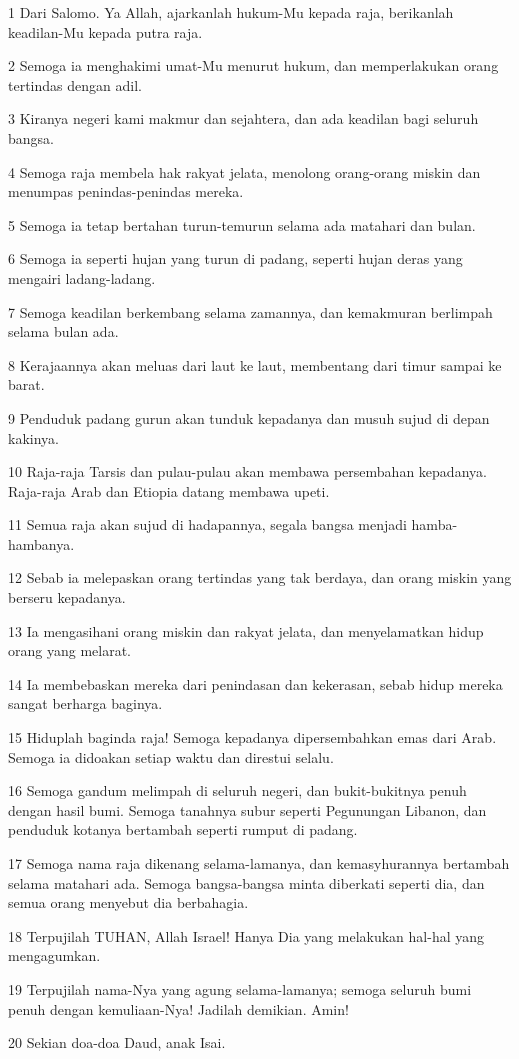 \par 1 Dari Salomo. Ya Allah, ajarkanlah hukum-Mu kepada raja, berikanlah keadilan-Mu kepada putra raja.
\par 2 Semoga ia menghakimi umat-Mu menurut hukum, dan memperlakukan orang tertindas dengan adil.
\par 3 Kiranya negeri kami makmur dan sejahtera, dan ada keadilan bagi seluruh bangsa.
\par 4 Semoga raja membela hak rakyat jelata, menolong orang-orang miskin dan menumpas penindas-penindas mereka.
\par 5 Semoga ia tetap bertahan turun-temurun selama ada matahari dan bulan.
\par 6 Semoga ia seperti hujan yang turun di padang, seperti hujan deras yang mengairi ladang-ladang.
\par 7 Semoga keadilan berkembang selama zamannya, dan kemakmuran berlimpah selama bulan ada.
\par 8 Kerajaannya akan meluas dari laut ke laut, membentang dari timur sampai ke barat.
\par 9 Penduduk padang gurun akan tunduk kepadanya dan musuh sujud di depan kakinya.
\par 10 Raja-raja Tarsis dan pulau-pulau akan membawa persembahan kepadanya. Raja-raja Arab dan Etiopia datang membawa upeti.
\par 11 Semua raja akan sujud di hadapannya, segala bangsa menjadi hamba-hambanya.
\par 12 Sebab ia melepaskan orang tertindas yang tak berdaya, dan orang miskin yang berseru kepadanya.
\par 13 Ia mengasihani orang miskin dan rakyat jelata, dan menyelamatkan hidup orang yang melarat.
\par 14 Ia membebaskan mereka dari penindasan dan kekerasan, sebab hidup mereka sangat berharga baginya.
\par 15 Hiduplah baginda raja! Semoga kepadanya dipersembahkan emas dari Arab. Semoga ia didoakan setiap waktu dan direstui selalu.
\par 16 Semoga gandum melimpah di seluruh negeri, dan bukit-bukitnya penuh dengan hasil bumi. Semoga tanahnya subur seperti Pegunungan Libanon, dan penduduk kotanya bertambah seperti rumput di padang.
\par 17 Semoga nama raja dikenang selama-lamanya, dan kemasyhurannya bertambah selama matahari ada. Semoga bangsa-bangsa minta diberkati seperti dia, dan semua orang menyebut dia berbahagia.
\par 18 Terpujilah TUHAN, Allah Israel! Hanya Dia yang melakukan hal-hal yang mengagumkan.
\par 19 Terpujilah nama-Nya yang agung selama-lamanya; semoga seluruh bumi penuh dengan kemuliaan-Nya! Jadilah demikian. Amin!
\par 20 Sekian doa-doa Daud, anak Isai.

